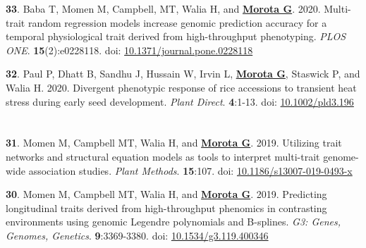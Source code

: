 \documentclass[margin,line,10pt]{res}
\newenvironment{list1}{
  \begin{list}{\ding{113}}{%
      \setlength{\itemsep}{0in}
      \setlength{\parsep}{0in} \setlength{\parskip}{0in}
      \setlength{\topsep}{0in} \setlength{\partopsep}{0in} 
      \setlength{\leftmargin}{0.17in}}}{\end{list}}
\begin{document}
\begin{resume}
\begin{list1}
    \vspace{0.5cm}
    
  \item  [{\bf 33}.] Baba T, Momen M, Campbell, MT, Walia H, and \textbf{\underline{Morota G}}. 2020. Multi-trait random regression models increase genomic prediction accuracy for a temporal physiological trait derived from high-throughput phenotyping. \emph{PLOS ONE}. \textbf{15}(2):e0228118. doi: \textcolor{blue}{\href{https://doi.org/10.1371/journal.pone.0228118}{10.1371/journal.pone.0228118}}
  
  \vspace{0.5cm}

\item [{\bf 32}.] Paul P, Dhatt B, Sandhu J, Hussain W, Irvin L, \textbf{\underline{Morota G}}, Staswick P, and Walia H. 2020. Divergent phenotypic response of rice accessions to transient heat stress during early seed development. \emph{Plant Direct}. \textbf{4}:1-13. doi: \textcolor{blue}{\href{https://doi.org/10.1002/pld3.196}{10.1002/pld3.196}}

  \end{list1}


\section{}
\begin{list1}
  
\item  [{\bf 31}.] Momen M, Campbell MT, Walia H, and \textbf{\underline{Morota G}}. 2019. Utilizing trait networks and structural equation models as tools to interpret multi-trait genome-wide association studies. \emph{Plant Methods}. \textbf{15}:107. doi: \textcolor{blue}{\href{https://doi.org/10.1186/s13007-019-0493-x}{10.1186/s13007-019-0493-x}}

     \vspace{0.5cm}
     
\item  [{\bf 30}.]  Momen M, Campbell MT, Walia H, and \textbf{\underline{Morota G}}. 2019. Predicting longitudinal traits derived from high-throughput phenomics in contrasting environments using genomic Legendre polynomials and B-splines. \emph{G3: Genes, Genomes, Genetics}. \textbf{9}:3369-3380.  doi: \textcolor{blue}{\href{https://doi.org/10.1534/g3.119.400346}{10.1534/g3.119.400346}}

     \vspace{0.5cm}


\end{list1}
\end{resume}
\end{document}
